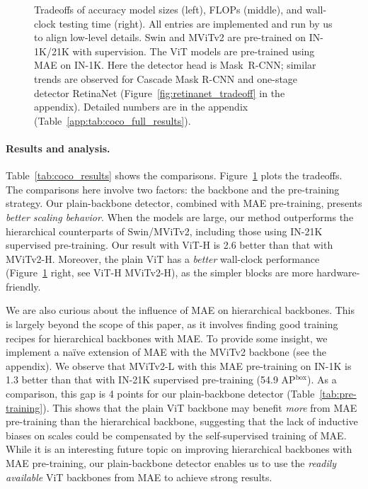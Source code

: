 \documentclass[runningheads]{llncs}
\newcommand{\boxAP}{AP$^\text{box}$\xspace}
\begin{document}
\begin{figure}[t]
\vspace{-1em}
\newcommand{\sz}{0.295}
\vspace{-.5em}
\caption{Tradeoffs of accuracy \vs model sizes (left), FLOPs (middle), and wall-clock testing time (right).
All entries are implemented and run by us to align low-level details.
Swin \cite{Liu2021} and MViTv2 \cite{Li2021a} are pre-trained on IN-1K/21K with supervision. The ViT models are pre-trained using MAE \cite{He2021} on IN-1K.
Here the detector head is \mbox{Mask R-CNN}; similar trends are observed for Cascade Mask R-CNN and one-stage detector RetinaNet (Figure~\ref{fig:retinanet_tradeoff} in the appendix). Detailed numbers are in the appendix (Table~\ref{app:tab:coco_full_results}).
\label{fig:tradeoff}
}
\vspace{-1.5em}
\end{figure}

\paragraph{Results and analysis.} Table~\ref{tab:coco_results} shows the comparisons.
Figure~\ref{fig:tradeoff} plots the tradeoffs.
The comparisons here involve two factors: the backbone and the pre-training strategy. Our plain-backbone detector, combined with MAE pre-training, presents \textit{better scaling behavior}. When the models are large, our method outperforms the hierarchical counterparts of Swin/MViTv2, including those using IN-21K supervised pre-training. Our result with ViT-H is 2.6 better than that with MViTv2-H. Moreover, the plain ViT has a \textit{better} wall-clock performance (Figure~\ref{fig:tradeoff} right, see ViT-H \vs MViTv2-H), as the {simpler} blocks are more hardware-friendly.

We are also curious about the influence of MAE on hierarchical backbones. This is largely beyond the scope of this paper, as it involves finding good training recipes for hierarchical backbones with MAE.
To provide some insight, we implement a na\"ive extension of MAE with the MViTv2 backbone (see the appendix). We observe that MViTv2-L with this MAE pre-training on IN-1K is 1.3 better than that with IN-21K supervised pre-training (54.9  \boxAP). As a comparison, this gap is 4 points for our plain-backbone detector (Table~\ref{tab:pre-training}). This shows that the plain ViT backbone may benefit \textit{more} from MAE pre-training than the hierarchical backbone, suggesting that the lack of inductive biases on scales could be compensated by the self-supervised training of MAE.
While it is an interesting future topic on improving hierarchical backbones with MAE pre-training, our plain-backbone detector enables us to use the \textit{readily available} ViT backbones from MAE to achieve strong results.
\end{document}
